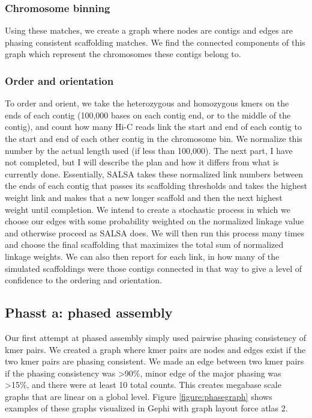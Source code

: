 {\subsubsection{Chromosome binning}

\par{
Using these matches, we create a graph where nodes are contigs and edges are phasing consistent scaffolding matches. We find the connected components of this graph which represent the chromosomes these contigs belong to. 
}

\subsubsection{Order and orientation}

\par{
To order and orient, we take the heterozygous and homozygous kmers on the ends of each contig (100,000 bases on each contig end, or to the middle of the contig), and count how many Hi-C reads link the start and end of each contig to the start and end of each other contig in the chromosome bin. We normalize this number by the actual length used (if less than 100,000). The next part, I have not completed, but I will describe the plan and how it differs from what is currently done. Essentially, SALSA takes these normalized link numbers between the ends of each contig that passes its scaffolding thresholds and takes the highest weight link and makes that a new longer scaffold and then the next highest weight until completion. We intend to create a stochastic process in which we choose our edges with some probability weighted on the normalized linkage value and otherwise proceed as SALSA does. We will then run this process many times and choose the final scaffolding that maximizes the total sum of normalized linkage weights. We can also then report for each link, in how many of the simulated scaffoldings were those contigs connected in that way to give a level of confidence to the ordering and orientation.
}

\subsection{Phasst a: phased assembly}

\par{
Our first attempt at phased assembly simply used pairwise phasing consistency of kmer pairs. We created a graph where kmer pairs are nodes and edges exist if the two kmer pairs are phasing consistent. We made an edge between two kmer pairs if the phasing consistency was >90\%, minor edge of the major phasing was >15\%, and there were at least 10 total counts. This creates megabase scale graphs that are linear on a global level. Figure \ref{figure:phasegraph} shows examples of these graphs visualized in Gephi with graph layout force atlas 2\cite{gephii}\cite{forceatlas2}. 
}

}
